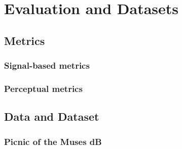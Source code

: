 \chapter{Evaluation and Datasets}\label{chap:evaluation}

\section{Metrics}
\subsection{Signal-based metrics}
\subsection{Perceptual metrics}

\section{Data and Dataset}

\subsection{Picnic of the Muses dB}

\subsection{\dechorate}




